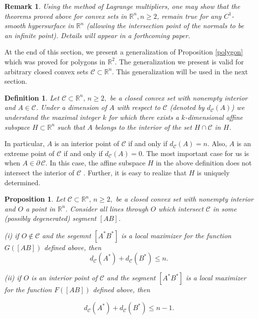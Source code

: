 \documentclass[a4paper,12pt]{amsart}
\newtheorem{prop}[thm]{Proposition}
\newtheorem{rem}[thm]{Remark}
\newtheorem{defi}[thm]{Definition}
\begin{document}
\begin{rem} {\rm
Using the method of Lagrange multipliers, one may show that the theorems proved above for convex sets in $\mathbb R^n, n\geq 2$, remain true for any $C^1$-smooth hypersurface in $\mathbb R^n$ (allowing the intersection point of the normals to be an infinite point). Details will appear in a forthcoming paper.}
\end{rem}

\medskip
At the end of this section, we present
a generalization of
Proposition \ref{polygon} which was proved for polygons in $\mathbb R^2$. The generalization we present is valid for arbitrary closed convex sets $\mathcal C \subset \mathbb R^n$. This generalization will be used in the next section.

\begin{defi} \label{dimlem}
{\rm Let  $\mathcal C \subset \mathbb{R}^n,\, n \geq 2,$ be a closed convex set with nonempty interior
 and $A \in \mathcal C$. Under a {\it dimension of $A$ with respect to $\mathcal C$} (denoted by $d_{\mathcal C}(A)$) we understand the maximal integer $k$
 for which there exists a $k$-dimensional affine subspace $H \subset \mathbb {R}^n$  such that $A$ belongs to the interior
of the set $H \cap \mathcal C$ in $H$.}
\end{defi}
In particular, $A$ is an interior point
of $\mathcal C$
if and only if $d_{\mathcal C}(A) = n.$ Also, $A$ is an extreme point of $\mathcal C$ if and only if $d_{\mathcal C}(A)=0$.
The most important case for us is when
$A \in \partial \, \mathcal C$. In this case,
the affine subspace $H$ in the above definition does not intersect the interior of $\mathcal C$ . Further, it is easy to realize that $H$ is uniquely determined.

\begin{prop} \label{p5}
Let  $\mathcal C \subset \mathbb{R}^n,\, n \geq 2,$ be a closed convex set with nonempty interior
 and $O$ a point in $\mathbb{R}^n $. Consider all lines through $O$ which intersect $\mathcal C$ in some (possibly degenerated) segment $[AB]$.

 (i) if $O \not \in \mathcal C$ and the segemnt
 $[A^*B^*]$ is a local maximizer for the function $G([AB])$ defined above, then
  $$d_{\mathcal C}(A^*) + d_{\mathcal C}(B^*) \leq n.$$

 (ii) if $O$ is an interior point of $\mathcal C$ and  the segment
 $[A^*B^*]$ is a local maximizer
for the function $F([AB])$ defined above, then

 $$d_{\mathcal C}(A^*) + d_{\mathcal C}(B^*)  \leq n-1.$$

\end{prop}
\end{document}
